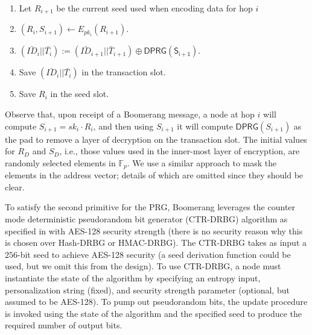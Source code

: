 \begin{enumerate}
	\item Let $R_{i+1}$ be the current seed used when encoding data for hop $i$
	\item $(R_{i},S_{i+1}) \gets E_{pk_{i}}(R_{i+1})$.
	\item $(\bar{ID}_{i} || \bar{T_{i}}) := (\bar{ID}_{i+1} || \bar{T}_{i+1}) \oplus \mathsf{DPRG(S_{i+1})}$. %
	\item Save $(\bar{ID}_{i} || \bar{T_{i}})$ in the transaction slot.
	\item Save $R_{i}$ in the seed slot.
\end{enumerate}
Observe that, upon receipt of a Boomerang message, a node at hop $i$ will compute $S_{i+1} = sk_i \cdot R_i$, and then using $S_{i+1}$ it will compute $\mathsf{DPRG}(S_{i+1})$ as the pad to remove a layer of decryption on the transaction slot. The initial values for $R_D$ and $S_D$, i.e., those values used in the inner-most layer of encryption, are randomly selected elements in $\mathbb{F}_p$. We use a similar approach to mask the elements in the address vector; details of which are omitted since they should be clear.

To satisfy the second primitive for the PRG, Boomerang leverages the counter mode deterministic pseudorandom bit generator (CTR-DRBG) algorithm as specified in \cite{nist-prng} with AES-128 security strength (there is no security reason why this is chosen over Hash-DRBG or HMAC-DRBG). The CTR-DRBG takes as input a $256$-bit seed to achieve AES-128 security (a seed derivation function could be used, but we omit this from the design). To use CTR-DRBG, a node must instantiate the state of the algorithm by specifying an entropy input, personalization string (fixed), and security strength parameter (optional, but assumed to be AES-128). To pump out pseudorandom bits, the update procedure is invoked using the state of the algorithm and the specified seed to produce the required number of output bits.


